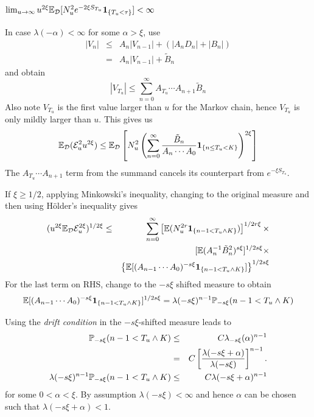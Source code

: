 \documentclass{beamer}
\begin{document}
\begin{frame}
  \frametitle{$\lim_{u \to \infty} u^{2\xi} \E_{\mathcal D}[N_u^2 e^{-2\xi
        S_{T_u}} \1{T_u < \tau}] < \infty$}
  In case $\lambda(-\alpha) < \infty$ for some $\alpha > \xi$, use
  \begin{eqnarray*}
    |V_n| &\leq& A_n|V_{n-1}| + (|A_n D_n| + |B_n|) \\
    &=& A_n |V_{n-1}| + \tilde B_n
  \end{eqnarray*}
  and obtain
  \[
  |V_{T_u}| \leq \sum_{n=0}^{\infty} A_{T_u} \cdots A_{n+1} \tilde B_n
  \]
  Also note $V_{T_u}$ is the first value larger than $u$ for the
  Markov chain, hence $V_{T_u}$ is only mildly larger than $u$. This
  gives us
  \[
  \E_{\mathcal D}(\mathcal E_u^2 u^{2\xi}) \leq
  \E_{\mathcal D} \left[
    N_u^2
    \left(
    \sum_{n=0}^{\infty} {
      \tilde B_n
      \over
      A_n \cdots A_0
    }
    \1{n \leq T_u < K}
    \right)^{2\xi}
    \right]
  \]
  The $A_{T_u} \cdots A_{n+1}$ term from the summand cancels its
  counterpart from $e^{-\xi S_{T_u}}$.
\end{frame}

\begin{frame}
  If $\xi \geq 1/2$, applying Minkowski's inequality, changing to
  the original measure and then using H\"older's inequality gives
  \begin{eqnarray*}
    (u^{2\xi} \E_{\mathcal D} \mathcal{E}^{2\xi}_u)^{1/2\xi} &\leq&
    \sum_{n=0}^\infty
    \left[\E (N_u^{2r} \1{n-1 < T_u \wedge K})\right]^{1/2r\xi} \times \\
    && [\E (A_n^{-1} \tilde B_n^2)^{s\xi}]^{1/2s\xi} \times \\
    && \left\{\E[
    (A_{n-1} \cdots A_0)^{-s\xi}
    \1{n-1 < T_u \wedge K}
    ]\right\}^{1/2s\xi}
  \end{eqnarray*}
  For the last term on RHS, change to the $-s\xi$ shifted measure to
  obtain
  \[
  \E[
    (A_{n-1} \cdots A_0)^{-s\xi}
    \1{n-1 < T_u \wedge K}
    ]^{1/2s\xi} = \lambda(-s\xi)^{n-1} \P_{-s\xi}(n-1 < T_u \wedge K)
  \]
\end{frame}

\begin{frame}
  Using the {\it drift condition} in the $-s\xi$-shifted measure leads to
  \begin{eqnarray*}
    \P_{-s\xi}(n-1 < T_u \wedge K) &\leq& C
    \lambda_{-s\xi}(\alpha)^{n-1} \\
    &=& C \left[
      {
      \lambda(-s\xi + \alpha)
      \over
      \lambda(-s\xi)
    }
    \right]^{n-1}. \\
    \lambda(-s\xi)^{n-1} \P_{-s\xi}(n-1 < T_u \wedge K) &\leq& C
    \lambda(-s\xi + \alpha)^{n-1}
  \end{eqnarray*}
  for some $0 < \alpha < \xi$. By assumption $\lambda(-s\xi) < \infty$
  and hence $\alpha$ can be chosen such that $\lambda(-s\xi + \alpha)
  < 1$.
\end{frame}
\end{document}
